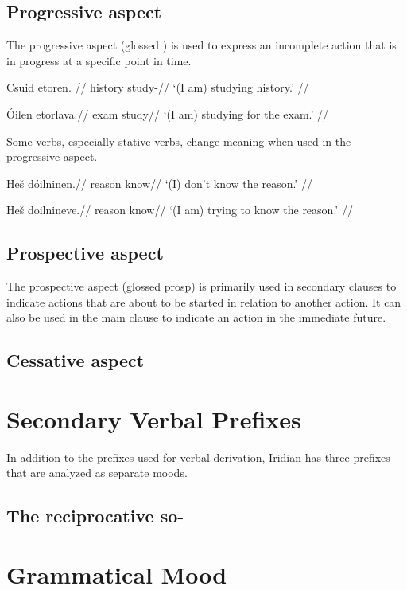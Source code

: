 \subsection{Progressive aspect}
\par The progressive aspect (glossed ) is used to express an incomplete action that is in progress at a specific point in time.

\pex
\a	\begingl
\gla Csuid etoren. //
\glb history study-//
\glft `(I am) studying history.' //
\endgl

\a	\begingl
\gla Óilen etorlava.//
\glb exam study//
\glft `(I am) studying for the exam.' //
\endgl
\xe

\par Some verbs, especially stative verbs, change meaning when used in the progressive aspect.

\pex
\a	\begingl
\gla He\v{s} dóilninen.//
\glb reason know//
\glft `(I) don't know the reason.' //
\endgl

\a	\begingl
\gla He\v{s} doilnineve.//
\glb reason know//
\glft `(I am) trying to know the reason.' //
\endgl
\xe


\subsection{Prospective aspect}
\par The prospective aspect (glossed {\sc prosp}) is primarily used in secondary clauses to indicate actions that are about to be started in relation to another action. It can also be used in the main clause to indicate an action in the immediate future.

\subsection{Cessative aspect}




\section{Secondary Verbal Prefixes}
In addition to the prefixes used for verbal derivation, Iridian has three prefixes that are analyzed as separate moods.
\subsection{The reciprocative so-}

\section{Grammatical Mood}

